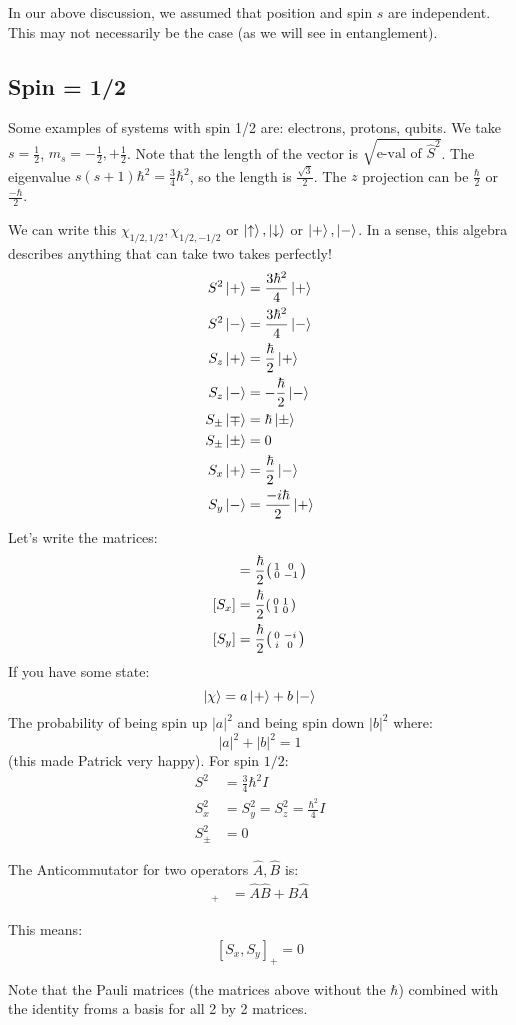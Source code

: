 In our above discussion, we assumed that position and spin $s$ are independent. This may not necessarily be the case (as we will see in entanglement).

\subsection{Spin = 1/2}
Some examples of systems with spin 1/2 are: electrons, protons, qubits. We take $s = \frac12$, $m_s = -\frac{1}{2}, +\frac{1}{2}$.
Note that the length of the vector is $\sqrt{\text{e-val of }\hat{S}^2}$. The eigenvalue $s(s + 1) \hbar^2 = \frac{3}{4} \hbar^2$,
so the length is $\frac{\sqrt{3}}{2}$. The $z$ projection can be $\frac{\hbar}{2}$ or $\frac{-\hbar}{2}$.

We can write this $\chi_{1/2, 1/2}, \chi_{1/2, -1/2}$ or $\ket{\uparrow}, \ket{\downarrow}$ or $\ket{+}, \ket{-}$. In
a sense, this algebra describes anything that can take two takes perfectly!
\begin{align*}
    S^2 \ket{+} &= \frac{3\hbar^2}{4} \ket{+} \\
    S^2 \ket{-} &= \frac{3\hbar^2}{4} \ket{-} \\
    S_z \ket{+} &= \frac{\hbar}{2} \ket{+} \\
    S_z \ket{-} &= -\frac{\hbar}{2} \ket{-} \\
    S_{\pm} \ket{\mp} &= \hbar \ket{\pm} \\
    S_{\pm} \ket{\pm} &= 0 \\
    S_x \ket{+} &= \frac{\hbar}{2} \ket{-} \\
    S_y \ket{-} &= \frac{-i\hbar}{2} \ket{+}
\end{align*}
Let's write the matrices:
\begin{align*}
    [S_z] &= \frac{\hbar}{2} \smqty(\pmat{3}) \\
    [S_x] &= \frac{\hbar}{2} \smqty(\pmat{1}) \\
    [S_y] &= \frac{\hbar}{2} \smqty(\pmat{2})
\end{align*}
If you have some state:
\[ \ket{\chi} = a \ket{+} + b \ket{-} \]
The probability of being spin up $|a|^2$ and being spin down $|b|^2$ where:
\[ |a|^2 + |b|^2 = 1 \]
(this made Patrick very happy). For spin $1/2$:
\begin{align*}
    S^2 &= \frac{3}{4} \hbar^2 I \\
    S_x^2 &= S_y^2 = S_z^2 = \frac{\hbar^2}{4} I \\
    S_{\pm}^2 &= 0
\end{align*}

\begin{definition}[Anticommutator]
    The Anticommutator for two operators $\hat{A}, \hat{B}$ is:
    \begin{align*}
        [\hat{A}, \hat{B}]_{+} &= \hat{A}\hat{B} + \hat{B} \hat{A}
    \end{align*}
\end{definition}

This means:
\[ [S_x, S_y]_{+} = 0 \]

Note that the Pauli matrices (the matrices above without the $\hbar$) combined with the identity froms a basis for all 2 by 2 matrices.